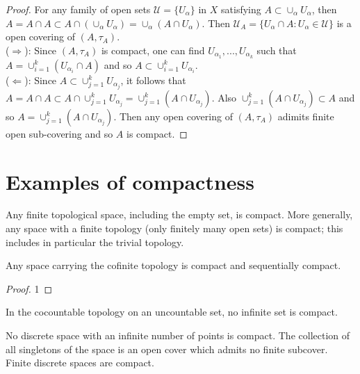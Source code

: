 \begin{proof}
    For any family of open sets $\mathcal{U}=\{U_{\alpha}\}$ in $X$ satisfying $A\subset \cup_{\alpha}U_{\alpha}$, 
    then $A=A\cap A\subset A\cap (\cup_{\alpha}U_{\alpha})= \cup_{\alpha} (A\cap U_{\alpha})$. 
    Then $\mathscr{U}_A=\{U_\alpha\cap A:U_\alpha\in \mathcal{U}\}$ is a open covering of $(A,\tau_A)$.\\
    ($\Rightarrow$): Since $(A,\tau_A)$ is compact, one can find $U_{\alpha_1}, ..., U_{\alpha_k}$ such that $A=\cup_{i=1}^k(U_{\alpha_i}\cap A)$
    and so $A\subset \cup_{i=1}^k U_{\alpha_i}$. \\
    ($\Leftarrow$): Since $A\subset \cup_{j=1}^k U_{\alpha_j}$, it follows that $A=A\cap A\subset A\cap \cup_{j=1}^k U_{\alpha_j}= \cup_{j=1}^k (A\cap U_{\alpha_j})$.
    Also $\cup_{j=1}^k (A\cap U_{\alpha_j})\subset A$ and so $A=\cup_{j=1}^k (A\cap U_{\alpha_j})$.
    Then any open covering of $(A,\tau_A)$ adimits finite open sub-covering and so $A$ is compact.
\end{proof}

\section{Examples of compactness}

\begin{example}{}{}
    Any finite topological space, including the empty set, is compact. 
    More generally, any space with a finite topology (only finitely many open sets) is compact; 
    this includes in particular the trivial topology.
\end{example}

\begin{example}{}{}
    Any space carrying the cofinite topology is compact and sequentially compact.
\end{example}

\begin{proof}
    1
\end{proof}

\begin{example}{}{}
    In the cocountable topology on an uncountable set, no infinite set is compact.
\end{example}

\begin{example}{}{}
    No discrete space with an infinite number of points is compact. 
    The collection of all singletons of the space is an open cover which admits no finite subcover. 
    Finite discrete spaces are compact.
\end{example}

